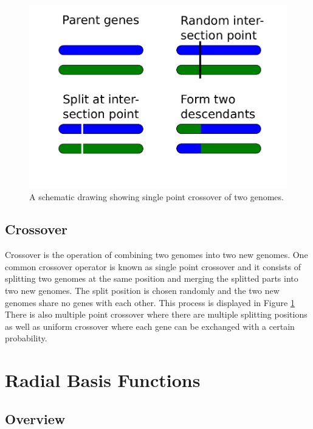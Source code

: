 \documentclass[a4paper,11pt]{kth-mag}
\begin{document}
\begin{figure}
\centering\includegraphics[scale=0.5]{crossover}
\caption{A schematic drawing showing single point crossover of two genomes.}
\label{crossover-figure}
\end{figure}

\subsection{Crossover}
Crossover is the operation of combining two genomes into two new genomes. One common crossover operator is known as  single point crossover and it consists of splitting two genomes at the same position and merging the splitted parts into two new genomes. The split position is chosen randomly and the two new genomes share no genes with each other. This process is displayed in Figure \ref{crossover-figure} There is also multiple point crossover where there are multiple splitting positions as well as uniform crossover where each gene can be exchanged with a certain probability.




\section{Radial Basis Functions}
\subsection{Overview}
\end{document}
